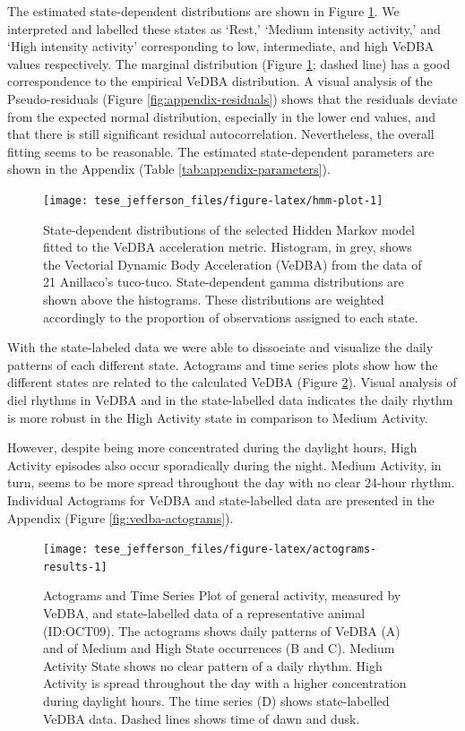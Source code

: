 \documentclass[english,msc,numbers,hidelinks]{coppe}
\begin{document}
  The estimated state-dependent distributions are shown in Figure \ref{fig:hmm-plot}. We interpreted and labelled these states as `Rest,' `Medium intensity activity,' and `High intensity activity' corresponding to low, intermediate, and high VeDBA values respectively. The marginal distribution (Figure \ref{fig:hmm-plot}; dashed line) has a good correspondence to the empirical VeDBA distribution. A visual analysis of the Pseudo-residuals (Figure \ref{fig:appendix-residuals}) shows that the residuals deviate from the expected normal distribution, especially in the lower end values, and that there is still significant residual autocorrelation. Nevertheless, the overall fitting seems to be reasonable. The estimated state-dependent parameters are shown in the Appendix (Table \ref{tab:appendix-parameters}).
  \begin{figure}

  {\centering \texttt{[image: tese\_jefferson\_files/figure-latex/hmm-plot-1]} 

  }

  \caption{State-dependent distributions of the selected Hidden Markov model fitted to the VeDBA acceleration metric. Histogram, in grey, shows the Vectorial Dynamic Body Acceleration (VeDBA) from the data of 21 Anillaco's tuco-tuco. State-dependent gamma distributions are shown above the histograms. These distributions are weighted accordingly to the proportion of observations assigned to each state.}\label{fig:hmm-plot}
  \end{figure}
  With the state-labeled data we were able to dissociate and visualize the daily patterns of each different state. Actograms and time series plots show how the different states are related to the calculated VeDBA (Figure \ref{fig:actograms-results}). Visual analysis of diel rhythms in VeDBA and in the state-labelled data indicates the daily rhythm is more robust in the High Activity state in comparison to Medium Activity.

  However, despite being more concentrated during the daylight hours, High Activity episodes also occur sporadically during the night. Medium Activity, in turn, seems to be more spread throughout the day with no clear 24-hour rhythm. Individual Actograms for VeDBA and state-labelled data are presented in the Appendix (Figure \ref{fig:vedba-actograms}).
  \begin{figure}

  {\centering \texttt{[image: tese\_jefferson\_files/figure-latex/actograms-results-1]} 

  }

  \caption{Actograms and Time Series Plot of general activity, measured by VeDBA, and state-labelled data of a representative animal (ID:OCT09). The actograms shows daily patterns of VeDBA (A) and of Medium and High State occurrences (B and C). Medium Activity State shows no clear pattern of a daily rhythm. High Activity is spread throughout the day with a higher concentration during daylight hours. The time series (D) shows state-labelled VeDBA data. Dashed lines shows time of dawn and dusk.}\label{fig:actograms-results}
  \end{figure}
  \clearpage
\end{document}
